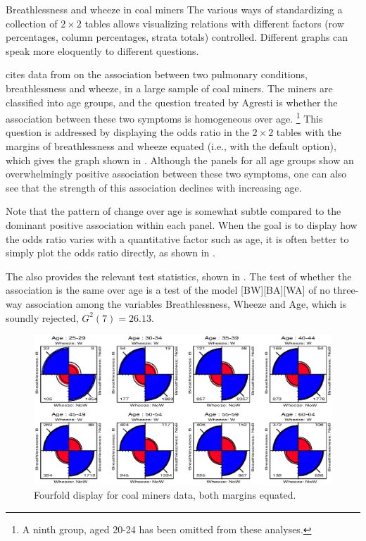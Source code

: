\begin{Example}[wheeze1]{Breathlessness and wheeze in coal miners}
The various ways of standardizing a collection of $2 \times 2$ tables
allows visualizing relations with different factors
(row percentages, column percentages, strata totals) controlled.
Different graphs can speak more eloquently to different questions.

\citet[Table 7.11]{Agresti:90} cites data from
\citet{AshfordSnowden:70} on the association between
two pulmonary conditions, breathlessness and wheeze, in a large sample of coal miners.
The miners are classified into age groups, and the question treated
by Agresti is whether the association between these two symptoms
is homogeneous over age.%
\footnote{A ninth group, aged 20-24 has been omitted from these
analyses.}
This question is addressed by displaying the odds ratio
in the $2 \times 2$ tables with the margins of breathlessness
and wheeze equated (i.e., with the default  option),
which gives the graph shown in .
Although the panels for all age groups show an overwhelmingly
positive association between these two symptoms, one can also
see that the strength of this association declines with increasing
age.

Note that the pattern of change over age is somewhat subtle
compared to the dominant positive association within each
panel.
When the goal is to display how the odds ratio varies with
a quantitative factor such as age, it is often better to simply
plot the odds ratio directly, as shown in .

The  also provides the relevant test statistics,
shown in .
The test of whether the association is the same over age
is a test of the \loglin{} model
[BW][BA][WA] of no three-way association among the
variables Breathlessness, Wheeze and Age,
which is soundly rejected,
$G^2 (7) = 26.13$.

\begin{figure}[htb]
  \centering
  \includegraphics[scale=.8,clip]{ch3/fig/pie2x2wh1}
  \caption[Fourfold display for coal miners data, both margins equated]{Fourfold display for coal miners data, both margins equated.}\label{fig:pie2x2wh1}
\end{figure}
%
\begin{Output}
\caption{Odds ratios and tests of homogeneity of association for coal miners data}\label{out:pie2x2wh}
\small

\end{Output}


\end{Example}
